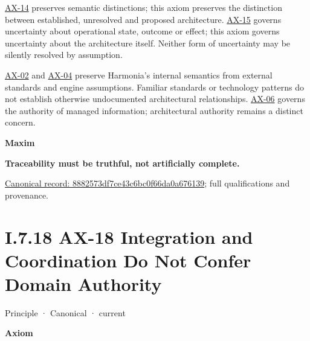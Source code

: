 \hyperref[element:d3fc6025dc7646d1b2020b51f7a44bfa]{AX-14} preserves semantic
distinctions; this axiom preserves the distinction between established,
unresolved and proposed architecture.
\hyperref[element:ef8abbaec37e4890ad78b9f263e67906]{AX-15} governs uncertainty
about operational state, outcome or effect; this axiom governs uncertainty
about the architecture itself. Neither form of uncertainty may be silently
resolved by assumption.



\hyperref[element:eee8c3783d964d18a7f9dcea85fcd4cf]{AX-02}
and \hyperref[element:54508cda80484a6caf95b901780eaf7d]{AX-04}
preserve Harmonia's internal semantics from external standards and engine
assumptions. Familiar standards or technology patterns do not establish
otherwise undocumented architectural relationships.
\hyperref[element:952c3b6148ce4fce94b69f99a0c2fec7]{AX-06} governs the authority
of managed information; architectural authority remains a distinct concern.



\par\medskip\textbf{Maxim}\par


\textbf{Traceability must be truthful, not artificially complete.}


{\footnotesize \href{../../../../continuum/motivation/principle/8882573df7ce43c6bc0f66da0a676139.md}{Canonical record: 8882573df7ce43c6bc0f66da0a676139}; full qualifications and provenance.}\par
\section*{I.7.18 AX-18 Integration and Coordination Do Not Confer Domain Authority}
\label{navigation:I.7.18}

\label{element:b8cafe3cf5904d2bb9a9767260fddf78}
{\small Principle · Canonical · current}\par

\par\medskip\textbf{Axiom}\par


